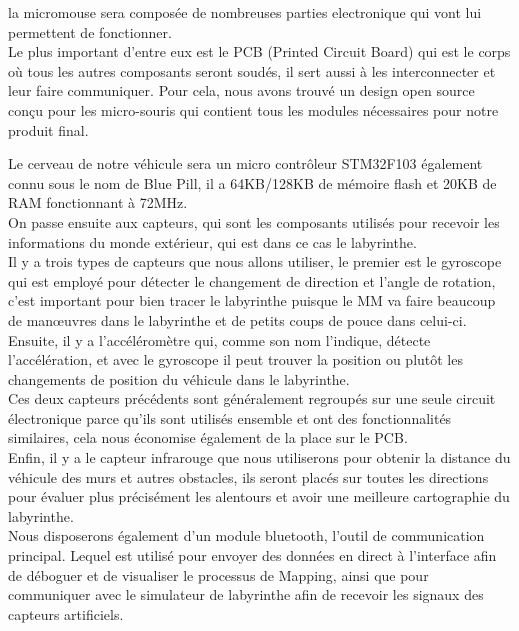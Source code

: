 	la micromouse sera composée de nombreuses parties electronique qui vont lui
permettent de fonctionner. \\


	Le plus important d'entre eux est le PCB (Printed Circuit Board) qui est le
corps où tous les autres composants seront soudés, il sert aussi à les
interconnecter et  leur faire communiquer. Pour cela, nous avons trouvé un
design open source \cite{Bulebule:1} conçu pour les micro-souris qui
contient tous les modules nécessaires pour notre produit final. \\




	Le cerveau de notre véhicule sera un micro contrôleur STM32F103 également connu 
sous le nom de Blue Pill, il a 64KB/128KB de mémoire flash et 20KB de RAM fonctionnant 
à 72MHz. \\


   On passe ensuite aux capteurs, qui sont les composants utilisés pour recevoir les 
informations du monde extérieur, qui est dans ce cas le labyrinthe. \\


	Il y a trois types de capteurs que nous allons utiliser, le premier est le gyroscope 
qui est employé pour détecter le changement de direction et l'angle de rotation, 
c'est important pour bien tracer le labyrinthe puisque le MM va faire beaucoup de 
manœuvres dans le labyrinthe et de petits coups de pouce dans celui-ci. \\


	Ensuite, il y a l'accéléromètre qui, comme son nom l'indique, détecte l'accélération, 
et avec le gyroscope il peut trouver la position ou plutôt les changements de position 
du véhicule dans le labyrinthe.\\


	Ces deux capteurs précédents sont généralement regroupés sur une seule circuit électronique 
parce qu'ils sont utilisés ensemble et ont des fonctionnalités similaires, cela nous 
économise également de la place sur le PCB. \\


	Enfin, il y a le capteur infrarouge que nous utiliserons pour obtenir la distance 
du véhicule des murs et autres obstacles, ils seront placés sur toutes les directions 
pour évaluer plus précisément les alentours et avoir une meilleure cartographie du 
labyrinthe. \\


	Nous disposerons également d'un module bluetooth, l'outil de communication principal. 
Lequel est utilisé pour envoyer des données en direct à l'interface afin de déboguer 
et de visualiser le processus de Mapping, ainsi que pour communiquer avec le simulateur 
de labyrinthe afin de recevoir les signaux des capteurs artificiels. \\


